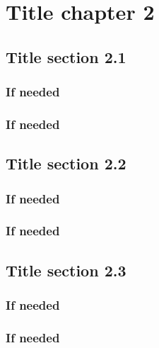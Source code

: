\chapter{Title chapter 2}
\label{ch2}

\minitoc 




\section{Title section 2.1}



\subsection{If needed}



\subsection{If needed}



\section{Title section 2.2}

\subsection{If needed}


\subsection{If needed}


\section{Title section 2.3}


\subsection{If needed}



\subsection{If needed}

